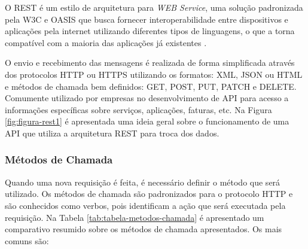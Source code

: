         O \gls{REST} é um estilo de arquitetura para \textit{\gls{WEB} Service},  uma solução padronizada pela \gls{W3C} e \gls{OASIS} que busca fornecer interoperabilidade entre dispositivos e aplicações pela internet utilizando diferentes tipos de linguagens, o que a torna compatível com a maioria das aplicações já existentes \cite{W3C}.
        
        O envio e recebimento das mensagens é realizada de forma simplificada através dos protocolos \gls{HTTP} ou \gls{HTTPS} utilizando os formatos: \gls{XML}, \gls{JSON} ou \gls{HTML} e métodos de chamada bem definidos: GET, POST, PUT, PATCH e DELETE. Comumente utilizado por empresas no desenvolvimento de \gls{API} para acesso a informações específicas sobre serviços, aplicações, faturas, etc. Na Figura \ref{fig:figura-rest1} é apresentada uma ideia geral sobre o funcionamento de uma API que utiliza a arquitetura REST para troca dos dados.
            
            \begin{figure}[!h]
    	    \end{figure}
    	
    	\subsubsection{Métodos de Chamada}
    	\label{sec:metodos-chamada}
    	
    	Quando uma nova requisição é feita, é necessário definir o método que será utilizado. Os métodos de chamada são padronizados para o protocolo \gls{HTTP} e são conhecidos como verbos, pois identificam a ação que será executada pela requisição. Na Tabela \ref{tab:tabela-metodos-chamada} é apresentado um comparativo resumido sobre os métodos de chamada apresentados. Os mais comuns são:
    	
